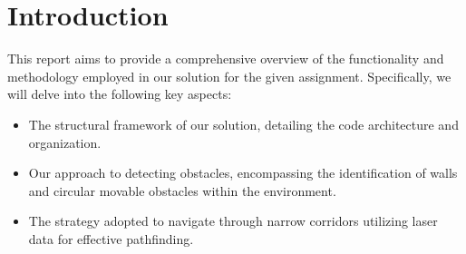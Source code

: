 \section{Introduction}
This report aims to provide a comprehensive overview of the functionality and methodology employed in our solution for the given assignment. Specifically, we will delve into the following key aspects:
\begin{itemize}
	\item The structural framework of our solution, detailing the code architecture and organization.
	\item Our approach to detecting obstacles, encompassing the identification of walls and circular movable obstacles within the environment.
	\item The strategy adopted to navigate through narrow corridors utilizing laser data for effective pathfinding.
\end{itemize}